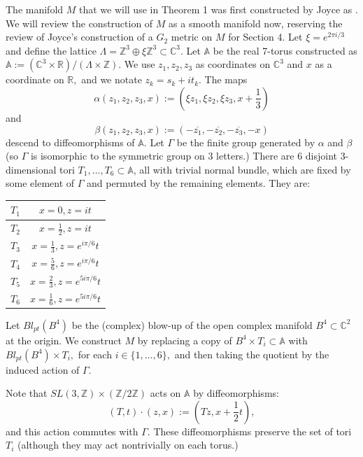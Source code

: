 \documentclass{amsart}
\theoremstyle{theorem}
\theoremstyle{definition}
\theoremstyle{definition}
\theoremstyle{definition}
\theoremstyle{theorem}
\theoremstyle{theorem}
\theoremstyle{theorem}
\theoremstyle{corollary}
\theoremstyle{question}
\theoremstyle{remark}
\begin{document}
The manifold $M$ that we will use in Theorem 1 was first constructed by Joyce as \cite[Example 7]{Joyce2}. We will review the construction of $M$ as a smooth manifold now, reserving the review of Joyce's construction of a $G_2$ metric on $M$ for Section 4. Let $\xi = e^{2\pi i/3}$ and define the lattice $\Lambda = \mathbb{Z}^3\oplus\xi\mathbb{Z}^3\subset \mathbb{C}^3.$ Let $\mathbb{A}$ be the real 7-torus constructed as $\mathbb{A} := \left(\mathbb{C}^3\times\mathbb{R}\right)/\left(\Lambda\times\mathbb{Z}\right).$ We use $z_1,z_2, z_3$ as coordinates on $\mathbb{C}^3$ and $x$ as a coordinate on $\mathbb{R},$ and we notate $z_k = s_k+it_k.$ The maps $$\alpha(z_1, z_2, z_3, x) := \left(\xi z_1, \xi z_2, \xi z_3, x+\frac13\right)$$ and $$\beta(z_1, z_2, z_3, x) := \left(-\overline{z_1}, -\overline{z_2}, -\overline{z_3}, -x\right)$$ descend to diffeomorphisms of $\mathbb{A}.$ Let $\Gamma$ be the finite group generated by $\alpha$ and $\beta$ (so $\Gamma$ is isomorphic to the symmetric group on 3 letters.) There are 6 disjoint 3-dimensional tori $T_1,\dots, T_6\subset \mathbb{A}$, all with trivial normal bundle, which are fixed by some element of $\Gamma$ and permuted by the remaining elements. They are: 

\medskip
\bgroup
\def\arraystretch{1.5}
\begin{tabular}{ c | c }
    $T_1$ & $x=0, z=it$ \\
    \hline
    $T_2$ & $x=\frac12, z=it$ \\
    \hline
    $T_3$ & $x=\frac13, z=e^{i\pi/6}t$ \\
    \hline
    $T_4$ & $x=\frac56, z=e^{i\pi/6}t$ \\
    \hline
    $T_5$ & $x=\frac23, z=e^{5i\pi/6}t$ \\
    \hline
    $T_6$ & $x=\frac16, z=e^{5i\pi/6}t$ \\
\end{tabular}
\egroup
\medskip

Let $Bl_{pt}(B^4)$ be the (complex) blow-up of the open complex manifold $B^4\subset \mathbb{C}^2$ at the origin. We construct $M$ by replacing a copy of $B^4\times T_i\subset\mathbb{A}$ with $Bl_{pt}(B^4)\times T_i,$ for each $i\in\{1,\dots, 6\},$ and then taking the quotient by the induced action of $\Gamma.$ 

Note that $SL(3, \mathbb{Z})\times(\mathbb{Z}/2\mathbb{Z})$ acts on $\mathbb{A}$ by diffeomorphisms: $$(T, t)\cdot (z, x) := (Tz, x+\frac12 t),$$ and this action commutes with $\Gamma.$ These diffeomorphisms preserve the set of tori $T_i$ (although they may act nontrivially on each torus.)
\end{document}
